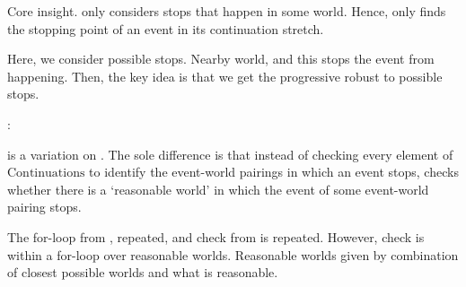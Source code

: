 \begin{note}
  Core insight.
  \citeauthor{Landman:1992wh} only considers stops that happen in some world.
  Hence, \AlgGetStops{} only finds the stopping point of an event in its continuation stretch.

  Here, we consider possible stops.
  Nearby world, and this stops the event from happening.
  Then, the key idea is that we get the progressive robust to possible stops.

  \AlgGetPStops{}:

  \begin{algorithm}[H]
    \label{PrAl:g-s}
    \caption{\AlgGetPStops{}}
    \SetAlgoLined
    \DontPrintSemicolon
  \end{algorithm}

  \AlgGetPStops{} is a variation on \AlgGetStops{}.
  The sole difference is that instead of checking every element of \(\text{Continuations}\) to identify the event-world pairings in which an event stops, \AlgGetPStops{} checks whether there is a `reasonable world' in which the event of some event-world pairing stops.
\end{note}

\begin{note}
  The for-loop from \AlgGetStops{}, repeated, and check from \AlgGetStops{} is repeated.
  However, check is within a for-loop over reasonable worlds.
  Reasonable worlds given by combination of closest possible worlds and what is reasonable.
\end{note}

